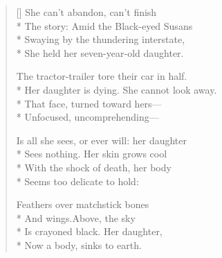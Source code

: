 \label{ch:unfinished}
\settowidth{\versewidth}{Her daughter is dying.  She cannot look away.}
\begin{verse}[\versewidth]
She can't abandon, can't finish\\*
The story: Amid the Black-eyed Susans\\*
Swaying by the thundering interstate,\\*
She held her seven-year-old daughter.

The tractor-trailer tore their car in half.\\*
Her daughter is dying.  She cannot look away.\\*
That face, turned toward hers---\\*
Unfocused, uncomprehending---

Is all she sees, or ever will: her daughter\\*
Sees nothing. Her skin grows cool\\*
With the shock of death, her body\\*
Seems too delicate to hold:

Feathers over matchstick bones\\*
And wings.\quad Above, the sky\\*
Is crayoned black.  Her daughter, \\*
Now a body, sinks to earth.
\end{verse}
